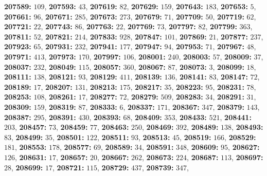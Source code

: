\textsf{\bfseries 207589:} $109$, \textsf{\bfseries 207593:} $43$, \textsf{\bfseries 207619:} $82$, \textsf{\bfseries 207629:} $159$, \textsf{\bfseries 207643:} $183$, \textsf{\bfseries 207653:} $5$, \textsf{\bfseries 207661:} $96$, \textsf{\bfseries 207671:} $285$, \textsf{\bfseries 207673:} $273$, \textsf{\bfseries 207679:} $71$, \textsf{\bfseries 207709:} $50$, \textsf{\bfseries 207719:} $62$, \textsf{\bfseries 207721:} $22$, \textsf{\bfseries 207743:} $86$, \textsf{\bfseries 207763:} $22$, \textsf{\bfseries 207769:} $73$, \textsf{\bfseries 207797:} $82$, \textsf{\bfseries 207799:} $363$, \textsf{\bfseries 207811:} $52$, \textsf{\bfseries 207821:} $214$, \textsf{\bfseries 207833:} $928$, \textsf{\bfseries 207847:} $101$, \textsf{\bfseries 207869:} $21$, \textsf{\bfseries 207877:} $237$, \textsf{\bfseries 207923:} $65$, \textsf{\bfseries 207931:} $232$, \textsf{\bfseries 207941:} $177$, \textsf{\bfseries 207947:} $94$, \textsf{\bfseries 207953:} $71$, \textsf{\bfseries 207967:} $48$, \textsf{\bfseries 207971:} $413$, \textsf{\bfseries 207973:} $170$, \textsf{\bfseries 207997:} $106$, \textsf{\bfseries 208001:} $240$, \textsf{\bfseries 208003:} $57$, \textsf{\bfseries 208009:} $37$, \textsf{\bfseries 208037:} $232$, \textsf{\bfseries 208049:} $115$, \textsf{\bfseries 208057:} $360$, \textsf{\bfseries 208067:} $87$, \textsf{\bfseries 208073:} $3$, \textsf{\bfseries 208099:} $18$, \textsf{\bfseries 208111:} $138$, \textsf{\bfseries 208121:} $93$, \textsf{\bfseries 208129:} $411$, \textsf{\bfseries 208139:} $136$, \textsf{\bfseries 208141:} $83$, \textsf{\bfseries 208147:} $72$, \textsf{\bfseries 208189:} $17$, \textsf{\bfseries 208207:} $131$, \textsf{\bfseries 208213:} $175$, \textsf{\bfseries 208217:} $35$, \textsf{\bfseries 208223:} $95$, \textsf{\bfseries 208231:} $78$, \textsf{\bfseries 208253:} $108$, \textsf{\bfseries 208261:} $17$, \textsf{\bfseries 208277:} $72$, \textsf{\bfseries 208279:} $509$, \textsf{\bfseries 208283:} $34$, \textsf{\bfseries 208291:} $31$, \textsf{\bfseries 208309:} $159$, \textsf{\bfseries 208319:} $87$, \textsf{\bfseries 208333:} $6$, \textsf{\bfseries 208337:} $171$, \textsf{\bfseries 208367:} $347$, \textsf{\bfseries 208379:} $143$, \textsf{\bfseries 208387:} $295$, \textsf{\bfseries 208391:} $430$, \textsf{\bfseries 208393:} $68$, \textsf{\bfseries 208409:} $353$, \textsf{\bfseries 208433:} $521$, \textsf{\bfseries 208441:} $203$, \textsf{\bfseries 208457:} $73$, \textsf{\bfseries 208459:} $77$, \textsf{\bfseries 208463:} $250$, \textsf{\bfseries 208469:} $392$, \textsf{\bfseries 208489:} $138$, \textsf{\bfseries 208493:} $83$, \textsf{\bfseries 208499:} $35$, \textsf{\bfseries 208501:} $122$, \textsf{\bfseries 208511:} $93$, \textsf{\bfseries 208513:} $45$, \textsf{\bfseries 208519:} $166$, \textsf{\bfseries 208529:} $181$, \textsf{\bfseries 208553:} $178$, \textsf{\bfseries 208577:} $69$, \textsf{\bfseries 208589:} $34$, \textsf{\bfseries 208591:} $348$, \textsf{\bfseries 208609:} $95$, \textsf{\bfseries 208627:} $126$, \textsf{\bfseries 208631:} $17$, \textsf{\bfseries 208657:} $20$, \textsf{\bfseries 208667:} $262$, \textsf{\bfseries 208673:} $224$, \textsf{\bfseries 208687:} $113$, \textsf{\bfseries 208697:} $28$, \textsf{\bfseries 208699:} $17$, \textsf{\bfseries 208721:} $115$, \textsf{\bfseries 208729:} $437$, \textsf{\bfseries 208739:} $347$, 
